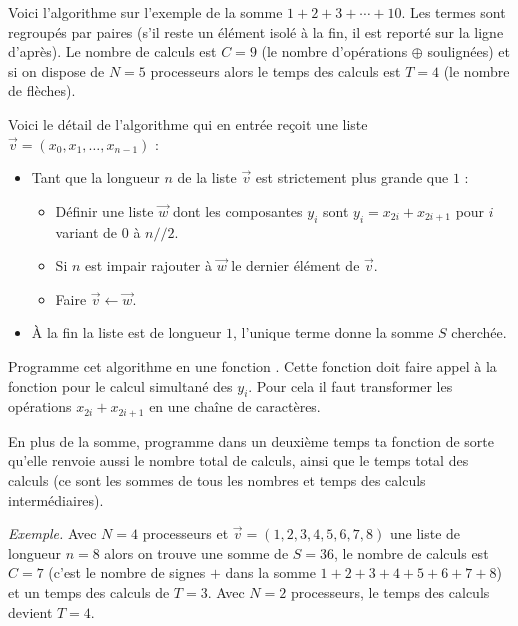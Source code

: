 \documentclass[11pt,class=report,crop=false]{standalone}
\begin{document}
\begin{activite}
\begin{enumerate}
Voici l'algorithme sur l'exemple de la somme $1+2+3+\cdots+10$. 
Les termes sont regroupés par paires (s'il reste un élément isolé à la fin, il est reporté sur la ligne d'après). Le nombre de calculs est $C=9$ (le nombre d'opérations $\oplus$ soulignées) et si on dispose de $N=5$ processeurs alors le temps des calculs est $T=4$ (le nombre de flèches). 
 
    
    Voici le détail de l'algorithme qui en entrée reçoit une liste $\vec v = (x_0,x_1,\ldots,x_{n-1})$ :
    \begin{itemize}
      \item Tant que la longueur $n$ de la liste $\vec v$ est strictement plus grande que $1$ :
      \begin{itemize}
        \item Définir une liste $\vec w$ dont les composantes $y_i$ sont $y_i = x_{2i}+x_{2i+1}$
        pour $i$ variant de $0$ à $n//2$.
        \item Si $n$ est impair rajouter à $\vec w$ le dernier élément de $\vec v$.
        \item Faire $\vec v \leftarrow \vec w$.
      \end{itemize}
      
      \item \`A la fin la liste est de longueur $1$, l'unique terme donne la somme $S$ cherchée. 
     \end{itemize}
     
     \medskip
     
     Programme cet algorithme en une fonction . Cette fonction doit faire appel à la fonction  pour le calcul simultané des $y_i$. Pour cela il faut transformer les opérations
     $x_{2i}+x_{2i+1}$ en une chaîne de caractères.
     
     En plus de la somme, programme dans un deuxième temps ta fonction de sorte qu'elle renvoie aussi le nombre total de calculs, ainsi que le temps total des calculs (ce sont les sommes de tous les nombres et temps des calculs intermédiaires).
     
     \emph{Exemple.} Avec $N=4$ processeurs et $\vec v = (1,2,3,4,5,6,7,8)$ une liste de longueur $n=8$ alors on trouve une somme de $S=36$, le nombre de calculs est $C = 7$ (c'est le nombre de signes \og{}$+$\fg{} dans la somme $1+2+3+4+5+6+7+8$) et un temps des calculs de $T = 3$. Avec $N=2$ processeurs, le temps des calculs devient $T=4$.
    

\end{enumerate}
\end{activite}
\end{document}
